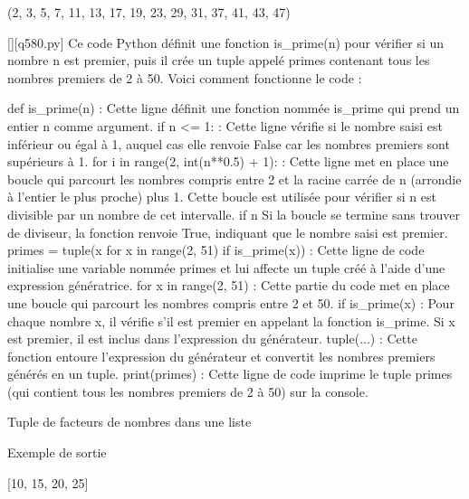 (2, 3, 5, 7, 11, 13, 17, 19, 23, 29, 31, 37, 41, 43, 47)
        \par
        \begin{solution}
            \renewcommand{\nomfichier}{q580.py}
            \pythonfile{\chemincode \nomfichier}[][\nomfichier]
            Ce code Python définit une fonction is_prime(n) pour vérifier si un nombre n est premier, puis il crée un tuple appelé primes contenant tous les nombres premiers de 2 à 50. Voici comment fonctionne le code :

    def is_prime(n) : Cette ligne définit une fonction nommée is_prime qui prend un entier n comme argument.
        if n <= 1: : Cette ligne vérifie si le nombre saisi est inférieur ou égal à 1, auquel cas elle renvoie False car les nombres premiers sont supérieurs à 1.
        for i in range(2, int(n**0.5) + 1): : Cette ligne met en place une boucle qui parcourt les nombres compris entre 2 et la racine carrée de n (arrondie à l'entier le plus proche) plus 1. Cette boucle est utilisée pour vérifier si n est divisible par un nombre de cet intervalle.
            if n %
        Si la boucle se termine sans trouver de diviseur, la fonction renvoie True, indiquant que le nombre saisi est premier.
    primes = tuple(x for x in range(2, 51) if is_prime(x)) : Cette ligne de code initialise une variable nommée primes et lui affecte un tuple créé à l'aide d'une expression génératrice.
        for x in range(2, 51) : Cette partie du code met en place une boucle qui parcourt les nombres compris entre 2 et 50.
        if is_prime(x) : Pour chaque nombre x, il vérifie s'il est premier en appelant la fonction is_prime. Si x est premier, il est inclus dans l'expression du générateur.
        tuple(...) : Cette fonction entoure l'expression du générateur et convertit les nombres premiers générés en un tuple.
    print(primes) : Cette ligne de code imprime le tuple primes (qui contient tous les nombres premiers de 2 à 50) sur la console.
        \end{solution}
        

        \question
        Tuple de facteurs de nombres dans une liste

Exemple de sortie

[10, 15, 20, 25]

